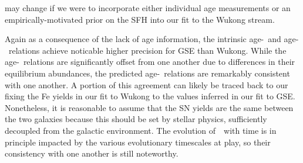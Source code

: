 \documentclass[ms.tex]{subfiles}
\begin{document}
may change if we were to incorporate either individual age measurements or an
empirically-motivated prior on the SFH into our fit to the Wukong stream.
\par
Again as a consequence of the lack of age information, the intrinsic
age-\feh~and age-\afe~relations achieve noticable higher precision for GSE
than Wukong.
While the age-\feh~relations are significantly offset from one another due to
differences in their equilibrium abundances, the predicted age-\afe~relations
are remarkably consistent with one another.
A portion of this agreement can likely be traced back to our fixing the Fe
yields in our fit to Wukong to the values inferred in our fit to GSE.
Nonetheless, it is reasonable to assume that the SN yields are the same between
the two galaxies because this should be set by stellar physics, sufficiently
decoupled from the galactic environment.
The evolution of~\afe~with time is in principle impacted by the various
evolutionary timescales at play, so their consistency with one another is still
noteworthy.
\end{document}
